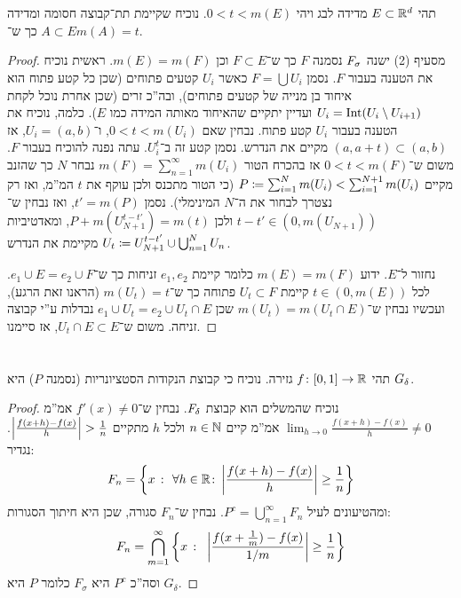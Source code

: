 \documentclass[]{../../../../tex/classes/homework}
\begin{document}
	\section{}
	תהי $E \subset \mathbb{R}^{d}$ מדידה לבג ויהי $0 < t < m(E)$. נוכיח שקיימת תת־קבוצה חסומה ומדידה $A \subset E$ כך ש־$m(A) = t$. 
	\begin{proof}
		מסעיף (2) ישנה $F_\sigma$ נסמנה $F$ כך ש־$F \subset E$ וכן $m(E) = m(F)$. ראשית נוכיח את הטענה בעבור $F$. נסמן $F = \bigcup U_i$ כאשר $U_i$ קטעים פתוחים (שכן כל קטע פתוח הוא איחוד בן מנייה של קטעים פתוחים), ובה''כ זרים (שכן אחרת נוכל לקחת $U_i = \operatorname{Int}(U_i \setminus U_{i + 1})$ ועדיין יתקיים שהאיחוד מאותה המידה כמו $E$). כלמה, נוכיח את הטענה בעבור $U_i$ קטע פתוח. נבחין שאם $0 < t < m(U_i)$, ו־$U_i = (a, b)$, אז $(a, a + t) \subset (a, b)$ מקיים את הנדרש. נסמן קטע זה ב־$U_i^{t}$. עתה נפנה להוכיח בעבור $F$. משום ש־$0 < t < m(F)$ אז בהכרח הטור $m(F) = \sum_{n = 1}^{\infty}m(U_i)$ נבחר $N$ כך שהזנב מקיים $P \coloneqq \sum_{i = 1}^{N}m(U_i) < \sum_{i = 1}^{N + 1} m(U_i)$ (כי הטור מתכנס ולכן עוקף את $t$ המ''מ, ואז רק נצטרך לבחור את ה־$N$ המינימלי). נסמן $t' = m(P)$, ואז נבחין ש־$t - t' \in (0, m(U_{N + 1}))$ ולכן $P + m(U_{N + 1}^{t - t'}) = m(t)$, ומאדטיביות $U_t \coloneqq U_{N + 1}^{t - t'} \cup \bigcup_{n = 1}^{N}U_n$ מקיימת את הנדרש. 
		
		נחזור ל־$E$. ידוע $m(E) = m(F)$ כלומר קיימת $e_1, e_2$ זניחות כך ש־$e_1 \cup E = e_2 \cup F$. לכל $t \in (0, m(E))$ קיימת $U_t \subset F$ פתוחה כך ש־$m(U_t) = t$ (הראנו זאת הרגע), ועכשיו נבחין ש־$m(U_t) = m(U_t \cap E)$ שכן $e_1 \cup U_t = e_2 \cup U_t \cap E$ נבדלות ע''י קבוצה זניחה. משום ש־$U_t \cap E \subset E$, אז סיימנו. 
	\end{proof}
	
	\section{}
	תהי $f \colon [0, 1] \to \mathbb{R}$ גזירה. נוכיח כי קבוצת הנקודות הסטציונריות (נסמנה $P$) היא $G_\delta$. 
	\begin{proof}
		נוכיח שהמשלים הוא קבוצת $F_\delta$. נבחין ש־$f'(x) \neq 0$ אמ''מ $\lim_{h \to 0} \frac{f(x + h) - f(x)}{h} \neq 0$ אמ''מ קיים $n \in \mathbb{N}$ ולכל $h$ מתקיים $\left \lvert \frac{f(x + h) - f(x)}{h} \right \rvert > \frac{1}{n}$. נגדיר: 
		\[ F_n = \ccb{x \ \co \ \forall h\in \R \co \sof{\frac{f(x + h) - f(x)}{h}} \ge \frac{1}{n}} \]
		ומהטיעונים לעיל $P^{c} = \bigcup_{n = 1}^{\infty}F_n$. נבחין ש־$F_n$ סגורה, שכן היא חיתוך הסגורות: 
		\[ F_n = \bigcap_{m = 1}^{\infty}\left \{ x \ \colon \ \left \lvert \frac{f(x + \frac{1}{m}) - f(x)}{1/m} \right \rvert \ge \frac{1}{n} \right \} \]
		וסה''כ $P^{c}$ היא $F_\sigma$ כלומר $P$ היא $G_\delta$. 
	\end{proof}
	
\end{document}
